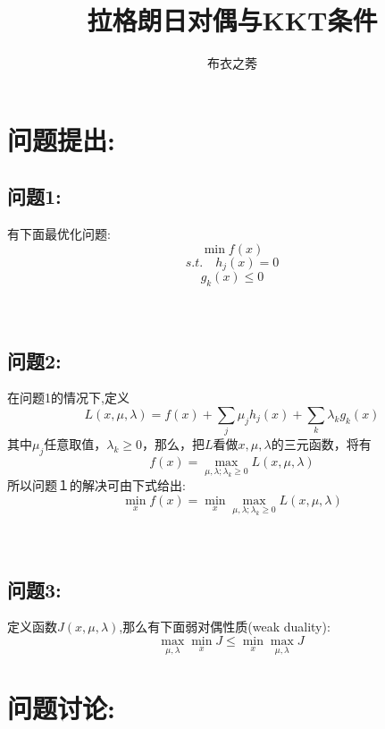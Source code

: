 \documentclass{article}
\title{拉格朗日对偶与KKT条件}
\author{布衣之莠}
\begin{document}
\maketitle
\section{问题提出:}
\subsection{问题1:}
有下面最优化问题:
\begin{equation}
\min f(x) \tag{1.1.1}
\end{equation}
\begin{equation}
s.t. \quad h_j(x)=0\tag{1.1.2}
\end{equation} 
\begin{equation}
g_k(x) \le 0  \tag{1.1.3}
\end{equation}
\\
\\
\subsection{问题2:}
在问题1的情况下,定义
\begin{equation}
L(x,\mu,\lambda)=f(x)+\sum_j\mu_jh_j(x)+\sum_k\lambda_kg_k(x) \tag{1.2.1}
\end{equation}
其中$\mu_j$任意取值，$\lambda_k \ge 0$，那么，把$L$看做$x,\mu,\lambda$的三元函数，将有
\begin{equation}
f(x)=\max_{\mu,\lambda;\lambda_k \ge 0}L(x,\mu,\lambda) \tag{1.2.2}
\end{equation}
所以问题１的解决可由下式给出:
\begin{equation}
\min_x f(x)= \min_x \max_{\mu,\lambda;\lambda_k\ge 0}L(x,\mu,\lambda) \tag{1.2.3}
\end{equation}
\\
\\
\subsection{问题3:}
定义函数$J(x,\mu,\lambda)$,那么有下面弱对偶性质(weak duality):
\begin{equation}
\max_{\mu,\lambda}\min_xJ\le \min_x\max_{\mu,\lambda}J\ \tag{1.3.1}
\end{equation}
\section{问题讨论:}
\end{document}
